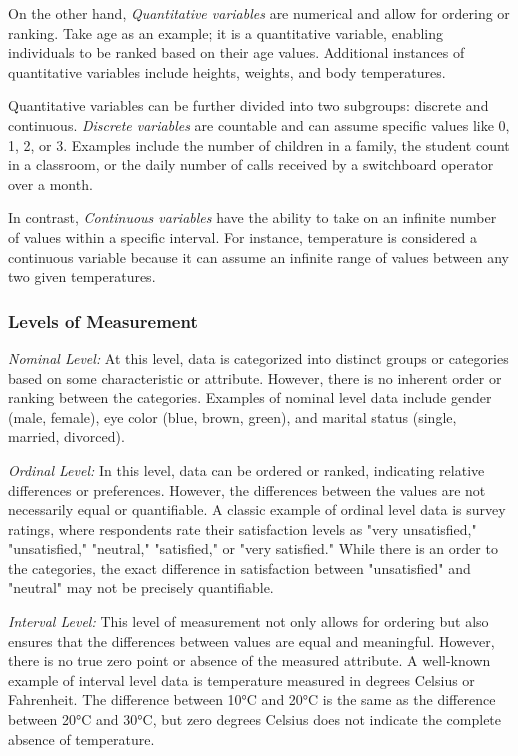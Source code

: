 \documentclass{article}
\begin{document}
On the other hand, \emph{Quantitative variables} are numerical and allow for ordering or ranking. Take age as an example; it is a quantitative variable, enabling individuals to be ranked based on their age values. Additional instances of quantitative variables include heights, weights, and body temperatures.

Quantitative variables can be further divided into two subgroups: discrete and continuous. \emph{Discrete variables} are countable and can assume specific values like 0, 1, 2, or 3. Examples include the number of children in a family, the student count in a classroom, or the daily number of calls received by a switchboard operator over a month.

In contrast, \emph{Continuous variables} have the ability to take on an infinite number of values within a specific interval. For instance, temperature is considered a continuous variable because it can assume an infinite range of values between any two given temperatures.

\subsubsection{Levels of Measurement}

\emph{Nominal Level:} At this level, data is categorized into distinct groups or categories based on some characteristic or attribute. However, there is no inherent order or ranking between the categories. Examples of nominal level data include gender (male, female), eye color (blue, brown, green), and marital status (single, married, divorced).

\emph{Ordinal Level:} In this level, data can be ordered or ranked, indicating relative differences or preferences. However, the differences between the values are not necessarily equal or quantifiable. A classic example of ordinal level data is survey ratings, where respondents rate their satisfaction levels as "very unsatisfied," "unsatisfied," "neutral," "satisfied," or "very satisfied." While there is an order to the categories, the exact difference in satisfaction between "unsatisfied" and "neutral" may not be precisely quantifiable.

\emph{Interval Level:} This level of measurement not only allows for ordering but also ensures that the differences between values are equal and meaningful. However, there is no true zero point or absence of the measured attribute. A well-known example of interval level data is temperature measured in degrees Celsius or Fahrenheit. The difference between 10°C and 20°C is the same as the difference between 20°C and 30°C, but zero degrees Celsius does not indicate the complete absence of temperature.
\end{document}
